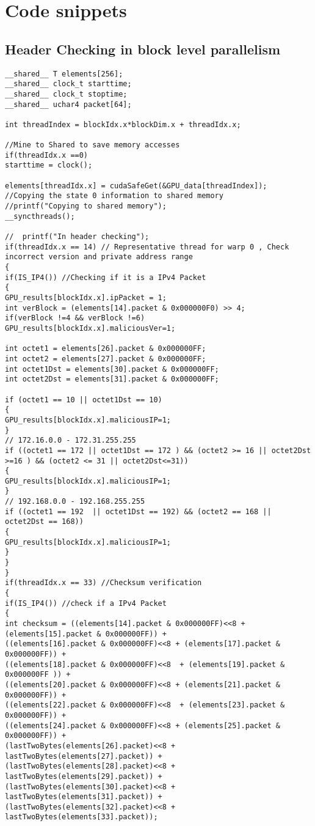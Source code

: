 \chapter{Code snippets\label{app:appa}}

\section{Header Checking in block level parallelism}
\begin{lstlisting}
__shared__ T elements[256];
__shared__ clock_t starttime;
__shared__ clock_t stoptime;
__shared__ uchar4 packet[64];

int threadIndex = blockIdx.x*blockDim.x + threadIdx.x;

//Mine to Shared to save memory accesses
if(threadIdx.x ==0)
starttime = clock();

elements[threadIdx.x] = cudaSafeGet(&GPU_data[threadIndex]);
//Copying the state 0 information to shared memory
//printf("Copying to shared memory");
__syncthreads();

//	printf("In header checking");
if(threadIdx.x == 14) // Representative thread for warp 0 , Check incorrect version and private address range
{
if(IS_IP4()) //Checking if it is a IPv4 Packet
{
GPU_results[blockIdx.x].ipPacket = 1;
int verBlock = (elements[14].packet & 0x000000F0) >> 4;
if(verBlock !=4 && verBlock !=6) GPU_results[blockIdx.x].maliciousVer=1;

int octet1 = elements[26].packet & 0x000000FF;
int octet2 = elements[27].packet & 0x000000FF;
int octet1Dst = elements[30].packet & 0x000000FF;
int octet2Dst = elements[31].packet & 0x000000FF;

if (octet1 == 10 || octet1Dst == 10)
{
GPU_results[blockIdx.x].maliciousIP=1;
}
// 172.16.0.0 - 172.31.255.255
if ((octet1 == 172 || octet1Dst == 172 ) && (octet2 >= 16 || octet2Dst >=16 ) && (octet2 <= 31 || octet2Dst<=31))
{
GPU_results[blockIdx.x].maliciousIP=1;
}
// 192.168.0.0 - 192.168.255.255
if ((octet1 == 192  || octet1Dst == 192) && (octet2 == 168 || octet2Dst == 168))
{
GPU_results[blockIdx.x].maliciousIP=1;
}
}
}
if(threadIdx.x == 33) //Checksum verification
{
if(IS_IP4()) //check if a IPv4 Packet
{
int checksum = ((elements[14].packet & 0x000000FF)<<8 + (elements[15].packet & 0x000000FF)) +
((elements[16].packet & 0x000000FF)<<8 + (elements[17].packet & 0x000000FF)) +
((elements[18].packet & 0x000000FF)<<8  + (elements[19].packet & 0x000000FF )) +
((elements[20].packet & 0x000000FF)<<8 + (elements[21].packet & 0x000000FF)) +
((elements[22].packet & 0x000000FF)<<8  + (elements[23].packet & 0x000000FF)) +
((elements[24].packet & 0x000000FF)<<8 + (elements[25].packet & 0x000000FF)) +
(lastTwoBytes(elements[26].packet)<<8 + lastTwoBytes(elements[27].packet)) +
(lastTwoBytes(elements[28].packet)<<8 + lastTwoBytes(elements[29].packet)) +
(lastTwoBytes(elements[30].packet)<<8 + lastTwoBytes(elements[31].packet)) +
(lastTwoBytes(elements[32].packet)<<8 + lastTwoBytes(elements[33].packet));


\end{lstlisting}
